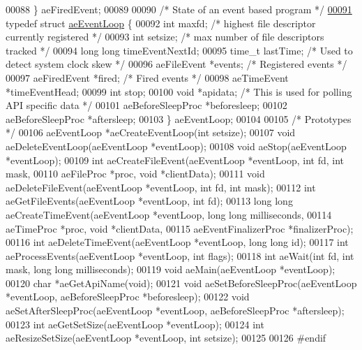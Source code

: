 \begin{DoxyCode}
00088 \} aeFiredEvent;
00089 
00090 \textcolor{comment}{/* State of an event based program */}
\hyperlink{structaeEventLoop}{00091} \textcolor{keyword}{typedef} \textcolor{keyword}{struct} \hyperlink{structaeEventLoop}{aeEventLoop} \{
00092     \textcolor{keywordtype}{int} maxfd;   \textcolor{comment}{/* highest file descriptor currently registered */}
00093     \textcolor{keywordtype}{int} setsize; \textcolor{comment}{/* max number of file descriptors tracked */}
00094     \textcolor{keywordtype}{long} \textcolor{keywordtype}{long} timeEventNextId;
00095     time\_t lastTime;     \textcolor{comment}{/* Used to detect system clock skew */}
00096     aeFileEvent *events; \textcolor{comment}{/* Registered events */}
00097     aeFiredEvent *fired; \textcolor{comment}{/* Fired events */}
00098     aeTimeEvent *timeEventHead;
00099     \textcolor{keywordtype}{int} stop;
00100     \textcolor{keywordtype}{void} *apidata; \textcolor{comment}{/* This is used for polling API specific data */}
00101     aeBeforeSleepProc *beforesleep;
00102     aeBeforeSleepProc *aftersleep;
00103 \} aeEventLoop;
00104 
00105 \textcolor{comment}{/* Prototypes */}
00106 aeEventLoop *aeCreateEventLoop(\textcolor{keywordtype}{int} setsize);
00107 \textcolor{keywordtype}{void} aeDeleteEventLoop(aeEventLoop *eventLoop);
00108 \textcolor{keywordtype}{void} aeStop(aeEventLoop *eventLoop);
00109 \textcolor{keywordtype}{int} aeCreateFileEvent(aeEventLoop *eventLoop, \textcolor{keywordtype}{int} fd, \textcolor{keywordtype}{int} mask,
00110         aeFileProc *proc, \textcolor{keywordtype}{void} *clientData);
00111 \textcolor{keywordtype}{void} aeDeleteFileEvent(aeEventLoop *eventLoop, \textcolor{keywordtype}{int} fd, \textcolor{keywordtype}{int} mask);
00112 \textcolor{keywordtype}{int} aeGetFileEvents(aeEventLoop *eventLoop, \textcolor{keywordtype}{int} fd);
00113 \textcolor{keywordtype}{long} \textcolor{keywordtype}{long} aeCreateTimeEvent(aeEventLoop *eventLoop, \textcolor{keywordtype}{long} \textcolor{keywordtype}{long} milliseconds,
00114         aeTimeProc *proc, \textcolor{keywordtype}{void} *clientData,
00115         aeEventFinalizerProc *finalizerProc);
00116 \textcolor{keywordtype}{int} aeDeleteTimeEvent(aeEventLoop *eventLoop, \textcolor{keywordtype}{long} \textcolor{keywordtype}{long} id);
00117 \textcolor{keywordtype}{int} aeProcessEvents(aeEventLoop *eventLoop, \textcolor{keywordtype}{int} flags);
00118 \textcolor{keywordtype}{int} aeWait(\textcolor{keywordtype}{int} fd, \textcolor{keywordtype}{int} mask, \textcolor{keywordtype}{long} \textcolor{keywordtype}{long} milliseconds);
00119 \textcolor{keywordtype}{void} aeMain(aeEventLoop *eventLoop);
00120 \textcolor{keywordtype}{char} *aeGetApiName(\textcolor{keywordtype}{void});
00121 \textcolor{keywordtype}{void} aeSetBeforeSleepProc(aeEventLoop *eventLoop, aeBeforeSleepProc *beforesleep);
00122 \textcolor{keywordtype}{void} aeSetAfterSleepProc(aeEventLoop *eventLoop, aeBeforeSleepProc *aftersleep);
00123 \textcolor{keywordtype}{int} aeGetSetSize(aeEventLoop *eventLoop);
00124 \textcolor{keywordtype}{int} aeResizeSetSize(aeEventLoop *eventLoop, \textcolor{keywordtype}{int} setsize);
00125 
00126 \textcolor{preprocessor}{#}\textcolor{preprocessor}{endif}
\end{DoxyCode}
